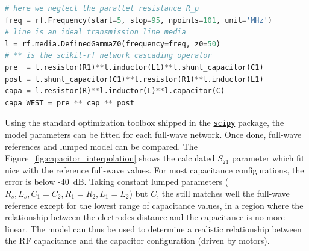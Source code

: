 \begin{lstlisting}[language=Python]
# here we neglect the parallel resistance R_p
freq = rf.Frequency(start=5, stop=95, npoints=101, unit='MHz')
# line is an ideal transmission line media
l = rf.media.DefinedGammaZ0(frequency=freq, z0=50)  
# ** is the scikit-rf network cascading operator
pre  = l.resistor(R1)**l.inductor(L1)**l.shunt_capacitor(C1)
post = l.shunt_capacitor(C1)**l.resistor(R1)**l.inductor(L1)
capa = l.resistor(R)**l.inductor(L)**l.capacitor(C)
capa_WEST = pre ** cap ** post  
\end{lstlisting}

Using the standard optimization toolbox shipped in the \href{https://www.scipy.org/}{\texttt{scipy}} package, the model parameters can be fitted for each full-wave network. Once done, full-wave references and lumped model can be compared. The Figure~\ref{fig:capacitor_interpolation} shows the calculated $S_{21}$ parameter which fit nice with the reference full-wave values. For most capacitance configurations, the error is below -40~dB. Taking constant lumped parameters ($R_s, L_s, C_1=C_2, R_1=R_2, L_1=L_2$) but $C$, the still matches well the full-wave reference except for the lowest range of capacitance values, in a region where the relationship between the electrodes distance and the capacitance is no more linear. The model can thus be used to determine a realistic relationship between the RF capacitance and the capacitor configuration (driven by motors).

